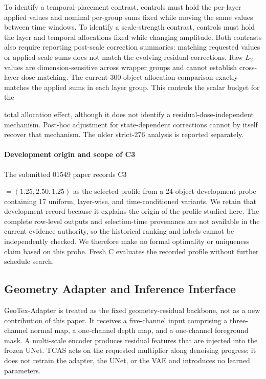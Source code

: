 \documentclass[times,twocolumn,final]{elsarticle}
\providecommand{\DIFadd}[1]{{\protect\color{blue} \sf #1}} %
\providecommand{\DIFaddbegin}{} %
\providecommand{\DIFaddend}{} %
\begin{document}
  \DIFaddbegin \DIFadd{To identify a temporal-placement contrast, controls must hold the per-layer applied values and nominal per-group sums fixed while moving the same values between time windows. To identify a scale-strength contrast, controls must hold the layer and temporal allocations fixed while changing amplitude. Both contrasts also require reporting post-scale correction summaries: matching requested values or applied-scale sums does not match the evolving residual corrections. Raw $L_2$ values are dimension-sensitive across wrapper groups and cannot establish cross-layer dose matching. The current 300-object allocation comparison exactly matches the applied sums in each layer group. This controls the scalar budget for }\DIFaddend the  

 \DIFaddbegin \DIFadd{total allocation effect, although it does not identify a residual-dose-independent mechanism. Post-hoc adjustment for state-dependent corrections cannot by itself recover that mechanism. The older strict-276 analysis is reported separately.
}\DIFaddend 

  \DIFaddbegin \paragraph{Development origin and scope of C3}
\DIFadd{The submitted 01549 paper records }\DIFaddend C3  

 \DIFaddbegin \DIFadd{$=(1.25,2.50,1.25)$ as the selected profile from a 24-object development probe containing 17 uniform, layer-wise, and time-conditioned variants. We retain that development record because it explains the origin of the profile studied here. The complete row-level outputs and selection-time provenance are not available in the current evidence authority, so the historical ranking and labels cannot be independently checked. We therefore make no formal optimality or uniqueness claim based on this probe. Fresh C evaluates the recorded profile without further schedule search}\DIFaddend .

\DIFaddbegin \subsection{Geometry Adapter and Inference Interface}
\label{subsec:adapterimpl}

\DIFaddend GeoTex-Adapter is   \DIFaddbegin \DIFadd{treated as the fixed geometry-residual backbone, not as a new contribution of this paper}\DIFaddend . It receives a   \DIFaddbegin \DIFadd{five-channel input comprising a three-channel }\DIFaddend normal map, a   \DIFaddbegin \DIFadd{one-channel }\DIFaddend depth map, and a   \DIFaddbegin \DIFadd{one-channel }\DIFaddend foreground mask. A multi-scale   \DIFaddbegin \DIFadd{encoder produces residual features that }\DIFaddend are injected into   \DIFaddbegin \DIFadd{the frozen }\DIFaddend UNet. TCAS acts on the   \DIFaddbegin \DIFadd{requested multiplier along denoising progress; it does not retrain the adapter, the UNet, or the VAE and introduces no learned parameters}\DIFaddend .
\end{document}

